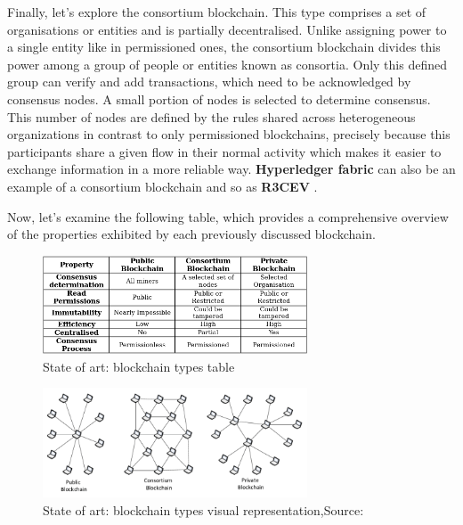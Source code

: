 Finally, let's explore the consortium blockchain. This type comprises a set of organisations or entities 
and is partially decentralised. Unlike assigning power to a single entity like in permissioned ones, 
the consortium blockchain divides this power among a group of people or entities known as consortia. Only this 
defined group can verify and add transactions, which need to be acknowledged by consensus nodes. A small 
portion of nodes is selected to determine consensus. This number of nodes are defined by the rules shared 
across heterogeneous organizations in contrast to only permissioned blockchains, precisely because this 
participants share a given flow in their normal activity which makes it easier to exchange information in a 
more reliable way. \textbf{Hyperledger fabric} can also be an example of a consortium blockchain and so as  
\textbf{R3CEV} \cite{consortium-blockchain} \cite{hyperledger} \cite{R3CEV} \cite{consortium-blockchain}.

Now, let's examine the following table, which provides a comprehensive overview of the properties exhibited by each previously discussed blockchain.

\begin{figure}[H]
	\centering
	\includegraphics[width=0.7\textwidth]{assets/state-of-art/type-blockchains.png} %
	\caption{State of art: blockchain types table}
	\label{fig:sample-image} 
\end{figure}

\begin{figure}[H]
	\centering
	\includegraphics[width=0.7\textwidth]{assets/state-of-art/type-blockchains2.png} %
	\caption{State of art: blockchain types visual representation,Source: \cite{private-vs-public-vs-consortium}}
	\label{fig:sample-image} 
\end{figure}

